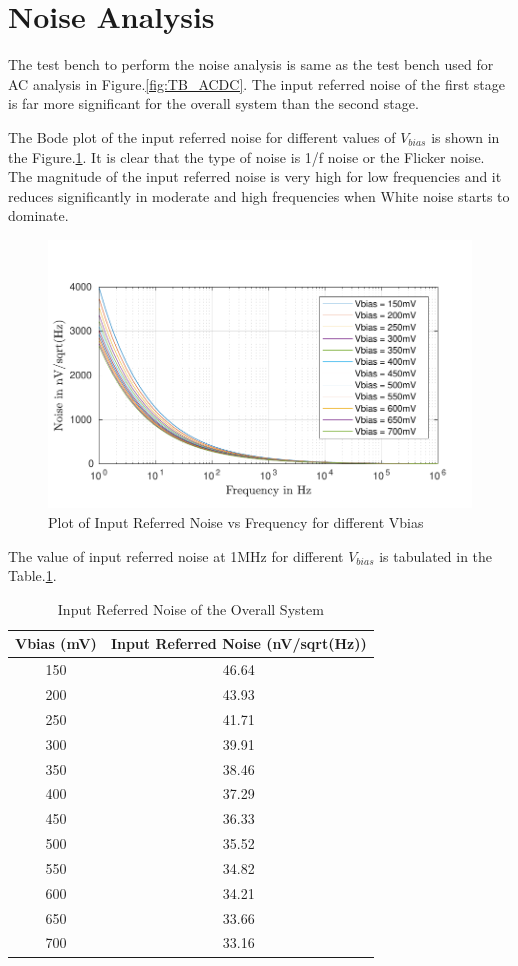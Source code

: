 \section{Noise Analysis}
The test bench to perform the noise analysis is same as the test bench used for AC analysis in Figure.\ref{fig:TB_ACDC}. The input referred noise of the first stage is far more significant for the overall system than the second stage.

The Bode plot of the input referred noise for different values of $V_{bias}$ is shown in the Figure.\ref{fig:NOISE}. It is clear that the type of noise is 1/f noise or the Flicker noise. The magnitude of the input referred noise is very high for low frequencies and it reduces significantly in moderate and high frequencies when White noise starts to dominate.

\begin{figure} [H]
\centering
\includegraphics[scale=1]{Figures/Plots/Ov_Noise.pdf}
\caption{Plot of Input Referred Noise vs Frequency for different Vbias}
\label{fig:NOISE}
\end{figure}

The value of input referred noise at 1MHz for different $V_{bias}$ is tabulated in the Table.\ref{tab:NOISE}.

\begin{table} [H]
\centering
\begin{tabular}{@{}cc@{}}
\toprule
Vbias (mV)			& Input Referred Noise (nV/sqrt(Hz))	\\ \midrule
150					& 46.64 \\
200					& 43.93 \\
250					& 41.71 \\
300					& 39.91 \\
350					& 38.46 \\
400					& 37.29 \\
450					& 36.33 \\
500					& 35.52 \\
550					& 34.82 \\
600					& 34.21 \\
650					& 33.66 \\
700 				& 33.16 \\
\bottomrule
\end{tabular}
\caption{Input Referred Noise of the Overall System}
\label{tab:NOISE}
\end{table}


